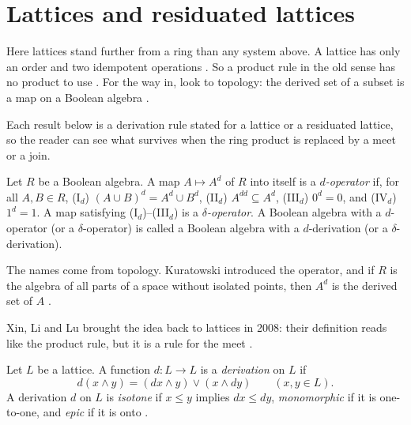\section{Lattices and residuated lattices}\label{sec:other-systems:lattices}

Here lattices stand further from a ring than any system above.
A lattice has only an order and two idempotent operations
\cite[p.~309]{XinLiLu2008}.
So a product rule in the old sense has no product to use
\cite[p.~309]{XinLiLu2008}.
For the way in, look to topology:
the
derived set of a subset is a map on a Boolean algebra
\cite[p.~365]{Goldberg1975}.

Each result below is a derivation rule stated for a lattice or a residuated lattice, so the reader can see what survives when the ring product is replaced by a meet or a join.

\begin{definition}\label{def:other:goldberg-derivation}
Let $R$ be a Boolean algebra. A map $A \mapsto A^{d}$ of $R$ into itself
is a \emph{$d$-operator} if, for all $A, B \in R$,
\textup{(I$_d$)} $(A \cup B)^{d} = A^{d} \cup B^{d}$,
\textup{(II$_d$)} $A^{dd} \subseteq A^{d}$,
\textup{(III$_d$)} $0^{d} = 0$, and
\textup{(IV$_d$)} $1^{d} = 1$.
A map satisfying \textup{(I$_d$)}--\textup{(III$_d$)} is a
\emph{$\delta$-operator}. A Boolean algebra with a $d$-operator (or a
$\delta$-operator) is called a Boolean algebra with a $d$-derivation (or a
$\delta$-derivation).
\end{definition}

The names come from topology. Kuratowski introduced the operator, and if
$R$ is the algebra of all parts of a space without isolated
points, then $A^{d}$ is the derived set of $A$
\cite[p.~365]{Goldberg1975}.

Xin, Li and Lu brought the idea back to lattices in 2008: their
definition reads like the product rule, but it is a rule for the meet
\cite[Definition~3.1, p.~309]{XinLiLu2008}.

\begin{definition}\label{def:other:lattice-derivation}
Let $L$ be a lattice. A function $d \colon L \to L$ is a \emph{derivation}
on $L$ if
\[
d(x \wedge y) = (dx \wedge y) \vee (x \wedge dy)
\qquad (x, y \in L).
\]
A derivation $d$ on $L$ is \emph{isotone} if $x \le y$ implies $dx \le dy$,
\emph{monomorphic} if it is one-to-one, and \emph{epic} if it is onto
\cite[Definition~3.7, p.~310]{XinLiLu2008}.
\end{definition}

